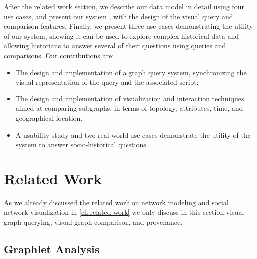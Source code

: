 
After the related work section, we describe our data model in detail using four use cases, and present our system \name, with the design of the visual query and comparison features.
Finally, we present three use cases demonstrating the utility of our system, showing it can be used to explore complex historical data and allowing  historians to answer several of their questions using queries and comparisons.
Our contributions are:
\begin{itemize}
    \item The design and implementation of a graph query system, synchronizing the visual representation of the query and the associated script;
    \item The design and implementation of visualization and interaction techniques aimed at comparing subgraphs, in terms of topology, attributes, time, and geographical location.
    \item A  usability study and two real-world use cases demonstrate the utility of the system to answer socio-historical questions.
\end{itemize}



\section{Related Work}

As we already discussed the related work on network modeling and social network visualization in \autoref{ch:related-work} we only discuss in this section visual graph querying, visual graph comparison, and provenance.


\subsection{Graphlet Analysis}

